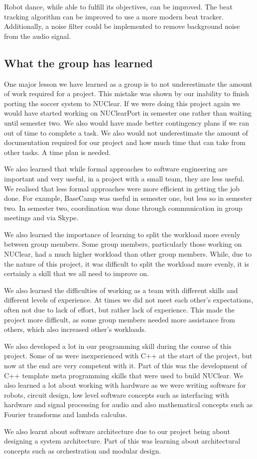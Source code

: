 \documentclass[english,12pt]{scrartcl}
\begin{document}
		Robot dance, while able to fulfill its objectives, can be improved.
		The beat tracking algorithm can be improved to use a more modern beat tracker.
		Additionally, a noise filter could be implemented to remove background noise from the audio signal. 
	
	\subsection{What the group has learned}
		One major lesson we have learned as a group is to not underestimate the amount of work required for a project.
		This mistake was shown by our inability to finish porting the soccer system to NUClear.
		If we were doing this project again we would have started working on NUClearPort in semester one rather than waiting until semester two.
		We also would have made better contingency plans if we ran out of time to complete a task.
		We also would not underestimate the amount of documentation required for our project and how much time that can take from other tasks.
		A time plan is needed. 

		We also learned that while formal approaches to software engineering are important and very useful, in a project with a small team, they are less useful.
		We realised that less formal approaches were more efficient in getting the job done.
		For example, BaseCamp was useful in semester one, but less so in semester two.
		In semester two, coordination was done through communication in group meetings and via Skype.

		We also learned the importance of learning to split the workload more evenly between group members.
		Some group members, particularly those working on NUClear, had a much higher workload than other group members.
		While, due to the nature of this project, it was difficult to split the workload more evenly, it is certainly a skill that we all need to improve on.

		We also learned the difficulties of working as a team with different skills and different levels of experience.
		At times we did not meet each other’s expectations, often not due to lack of effort, but rather lack of experience.
		This made the project more difficult, as some group members needed more assistance from others, which also increased other’s workloads.

		We also developed a lot in our programming skill during the course of this project.
		Some of us were inexperienced with C++ at the start of the project, but now at the end are very competent with it.
		Part of this was the development of C++ template meta programming skills that were used to build NUClear.
		We also learned a lot about working with hardware as we were writing software for robots, circuit design, low level software concepts such as interfacing with hardware and signal processing for audio and also mathematical concepts such as Fourier transforms and lambda calculus. 
		
		We also learnt about software architecture due to our project being about designing a system architecture.
		Part of this was learning about architectural concepts such as orchestration and modular design.
\end{document}
